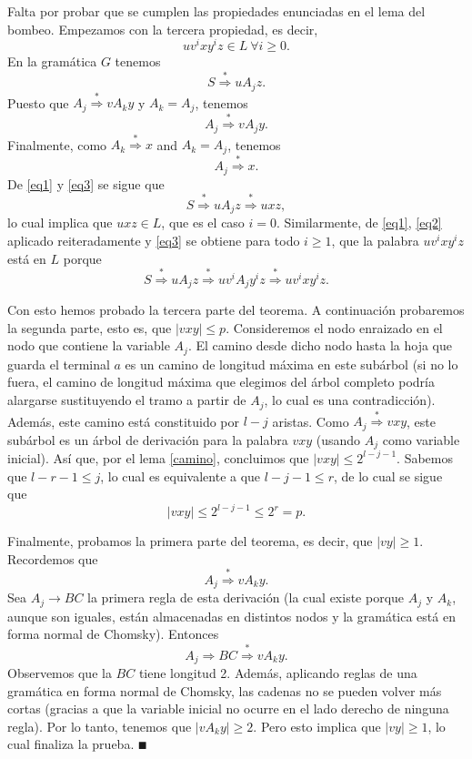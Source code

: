 \documentclass[twoside]{article}
\newcommand{\derive}{\overset{*}{\Rightarrow}}
\begin{document}
\begin{dem}
Falta por probar que se cumplen las propiedades enunciadas en el lema del bombeo. Empezamos con la tercera propiedad, es decir, 
$$uv^ixy^iz\in L\ \forall i\geq 0.$$
En la gramática $G$ tenemos 
\begin{equation}\label{eq1}
S\overset{*}{\Rightarrow}uA_jz.
\end{equation}
Puesto que $A_j\overset{*}{\Rightarrow} vA_ky$ y $A_k=A_j$, tenemos
\begin{equation}\label{eq2}
A_j\derive vA_jy.
\end{equation}
Finalmente, como $A_k\derive x$ and $A_k=A_j$, tenemos
\begin{equation}\label{eq3}
A_j\derive x.
\end{equation}
De \ref{eq1} y \ref{eq3} se sigue que 
$$S\derive uA_jz\derive uxz,$$
lo cual implica que $uxz\in L$, que es el caso $i=0$. Similarmente, de \ref{eq1}, \ref{eq2} aplicado reiteradamente y \ref{eq3} se obtiene para todo $i\geq 1$, que la palabra $uv^ixy^iz$ está en $L$ porque
$$S\derive uA_jz\derive uv^iA_jy^iz\derive uv^ixy^iz.$$

Con esto hemos probado la tercera parte del teorema. A continuación probaremos la segunda parte, esto es, que $|vxy|\leq p$. Consideremos el nodo enraizado en el nodo que contiene la variable $A_j$. El camino desde dicho nodo hasta la hoja que guarda el terminal $a$ es un camino de longitud máxima en este subárbol (si no lo fuera, el camino de longitud máxima que elegimos del árbol completo podría alargarse sustituyendo el tramo a partir de $A_j$, lo cual es una contradicción). Además, este camino está constituido por $l-j$ aristas. Como $A_j\derive vxy$, este subárbol es un árbol de derivación para la palabra $vxy$ (usando $A_j$ como variable inicial). Así que, por el lema \ref{camino}, concluimos que $|vxy|\leq 2^{l-j-1}$. Sabemos que $l-r-1\leq j$, lo cual es equivalente a que $l-j-1\leq r$, de lo cual se sigue que
$$|vxy|\leq 2^{l-j-1}\leq 2^r=p.$$

Finalmente, probamos la primera parte del teorema, es decir, que $|vy|\geq 1$. Recordemos que
$$A_j\derive vA_ky.$$
Sea $A_j\to BC$ la primera regla de esta derivación (la cual existe porque $A_j$ y $A_k$, aunque son iguales, están almacenadas en distintos nodos y la gramática está en forma normal de Chomsky). Entonces %
$$A_j\Rightarrow BC\derive vA_ky.$$
Observemos que la $BC$ tiene longitud 2. Además, aplicando reglas de una gramática en forma normal de Chomsky, las cadenas no se pueden volver más cortas (gracias a que la variable inicial no ocurre en el lado derecho de ninguna regla). Por lo tanto, tenemos que $|vA_ky|\geq 2$. Pero esto implica que $|vy|\geq 1$, lo cual finaliza la prueba.
$\QED$
\end{dem}
\end{document}
